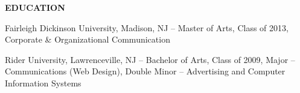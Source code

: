 \documentclass[]{article}
\begin{document}
\textbf{EDUCATION}

Fairleigh Dickinson University, Madison, NJ -- Master of Arts, Class of
2013, Corporate \& Organizational Communication

Rider University, Lawrenceville, NJ -- Bachelor of Arts, Class of 2009,
Major -- Communications (Web Design), Double Minor -- Advertising and
Computer Information Systems
\end{document}
